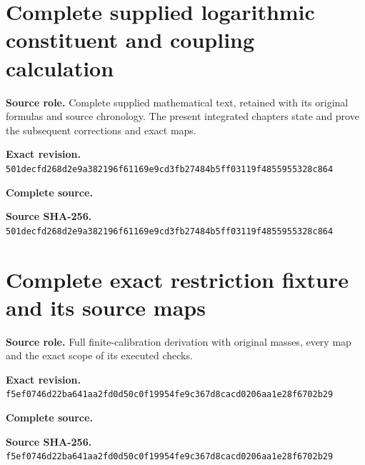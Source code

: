 \begingroup
\sloppy
\small
\clearpage
\section{Complete supplied logarithmic constituent and coupling calculation}
\noindent\textbf{Source role.} Complete supplied mathematical text, retained with its original formulas and source chronology. The present integrated chapters state and prove the subsequent corrections and exact maps.\par
\noindent\textbf{Exact revision.} \nolinkurl{501decfd268d2e9a382196f61169e9cd3fb27484b5ff03119f4855955328c864}\par
\noindent\textbf{Complete source.} \par
\noindent\textbf{Source SHA-256.} \nolinkurl{501decfd268d2e9a382196f61169e9cd3fb27484b5ff03119f4855955328c864}\par\medskip

\endgroup

\begingroup
\sloppy
\small
\clearpage
\section{Complete exact restriction fixture and its source maps}
\noindent\textbf{Source role.} Full finite-calibration derivation with original masses, every map and the exact scope of its executed checks.\par
\noindent\textbf{Exact revision.} \nolinkurl{f5ef0746d22ba641aa2fd0d50c0f19954fe9c367d8cacd0206aa1e28f6702b29}\par
\noindent\textbf{Complete source.} \par
\noindent\textbf{Source SHA-256.} \nolinkurl{f5ef0746d22ba641aa2fd0d50c0f19954fe9c367d8cacd0206aa1e28f6702b29}\par\medskip

\endgroup
